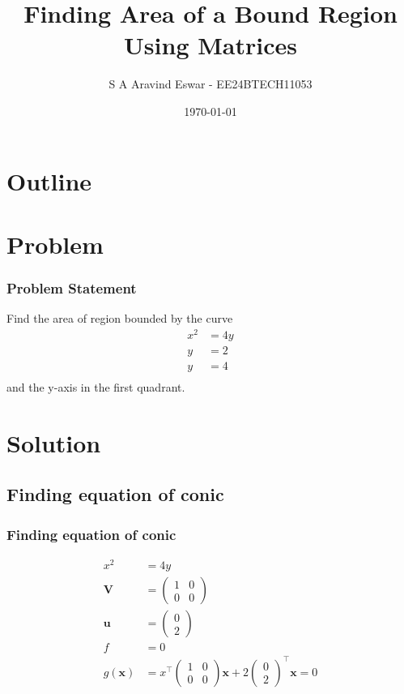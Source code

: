 \documentclass{beamer}
\title{Finding Area of a Bound Region Using Matrices}
\author{S A Aravind Eswar - EE24BTECH11053}
\date{\today}
\theoremstyle{remark}
\newcommand{\myvec}[1]{\ensuremath{\begin{pmatrix}#1\end{pmatrix}}}
\let\vec\mathbf
\numberwithin{equation}{section}
\begin{document}
\begin{frame}
\titlepage
\end{frame}

\section*{Outline}
\begin{frame}
\tableofcontents
\end{frame}
\section{Problem}
\begin{frame}
\frametitle{Problem Statement}
%
Find the area of region bounded by the curve 
\begin{align}
    x^2 &= 4y\\
    y&=2\\
    y&=4\\
\end{align}
and the y-axis in the first quadrant.
\end{frame}

\section{Solution}

\subsection{Finding equation of conic}
\begin{frame}
    \frametitle{Finding equation of conic}

    \begin{align}
        x^2 &= 4y\\
        \vec{V} &= \myvec{1 & 0\\ 0 & 0}\\
        \vec{u} &= \myvec{0\\2}\\
        f &= 0\\
        g(\vec{x}) &= x^\top\myvec{1 & 0\\0 & 0}\vec{x} + 2\myvec{0\\2}^\top\vec{x} = 0
    \end{align}
\end{frame}
\end{document}
